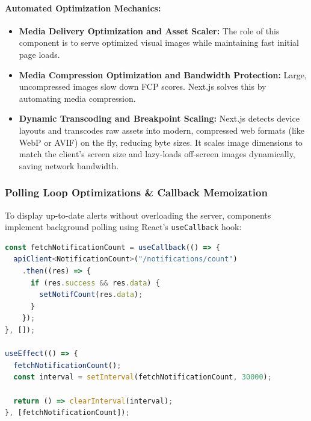 \documentclass[12pt,a4paper]{article}
\begin{document}
\paragraph{Automated Optimization Mechanics:}
\begin{itemize}[leftmargin=2em]
    \item \textbf{Media Delivery Optimization and Asset Scaler:} The role of this component is to serve optimized visual images while maintaining fast initial page loads.
    \item \textbf{Media Compression Optimization and Bandwidth Protection:} Large, uncompressed images slow down FCP scores. Next.js solves this by automating media compression.
    \item \textbf{Dynamic Transcoding and Breakpoint Scaling:} Next.js detects device layouts and transcodes raw assets into modern, compressed web formats (like WebP or AVIF) on the fly, reducing byte sizes. It scales image dimensions to match the client's screen size and lazy-loads off-screen images dynamically, saving network bandwidth.
\end{itemize}

\subsubsection{Polling Loop Optimizations \& Callback Memoization}

To display up-to-date alerts without overloading the server, components implement background polling using React's \texttt{useCallback} hook:

\begin{lstlisting}[language=TypeScript,title={useCallback Polling Optimization}]
const fetchNotificationCount = useCallback(() => {
  apiClient<NotificationCount>("/notifications/count")
    .then((res) => {
      if (res.success && res.data) {
        setNotifCount(res.data);
      }
    });
}, []);

useEffect(() => {
  fetchNotificationCount();
  const interval = setInterval(fetchNotificationCount, 30000);
  
  return () => clearInterval(interval);
}, [fetchNotificationCount]);
\end{lstlisting}
\end{document}
